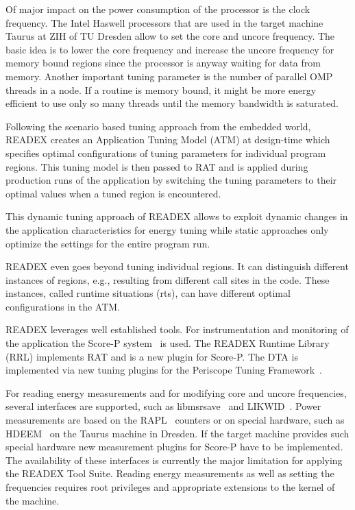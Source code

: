 \documentclass[runningheads]{llncs}
\begin{document}
Of major impact on the power consumption of the processor is the clock frequency. The Intel Haswell processors that are used in the target machine Taurus at ZIH of TU Dresden allow to set the core and  uncore frequency. The basic idea is to lower the core frequency and increase the uncore frequency for memory bound regions since the processor is anyway waiting for data from memory.  Another important tuning parameter is the number of parallel OMP threads in a node. If a routine is memory bound, it might be more energy efficient to use only so many threads until the memory bandwidth is saturated. 

Following the scenario based tuning approach \cite{filippopoulos2013exploration} from the embedded world, READEX creates an Application Tuning Model (ATM) at design-time which specifies optimal configurations of tuning parameters for individual program regions. This tuning model is then passed to RAT and is applied during production runs of the application by switching the tuning parameters to their optimal values when a tuned region is encountered. 

This dynamic tuning approach of READEX allows to exploit dynamic changes in the application characteristics for energy tuning while static approaches only optimize the settings for the entire program run. 

READEX even goes beyond tuning individual regions. It can distinguish different instances of regions, e.g., resulting from different call sites in the code. These instances, called runtime situations (rts), can have different optimal configurations in the ATM. 

READEX leverages well established tools. For instrumentation and monitoring of the application the Score-P system~\cite{knupfer2012score} is used. The READEX Runtime Library (RRL) implements RAT and is a new plugin for Score-P. The DTA is implemented via new tuning plugins for the Periscope Tuning Framework~\cite{PTF2.0IEEE2016}.  

For reading energy measurements and for modifying core and uncore frequencies, several interfaces are supported, such as libmsrsave~\cite{msrsave} and LIKWID~\cite{LIKWID}. Power measurements are based on the RAPL~\cite{Intel2018} counters or on special hardware, such as HDEEM~\cite{hdeem} on the Taurus machine in Dresden. If the target machine provides such special hardware new measurement plugins for Score-P have to be implemented. The availability of these interfaces is currently the major limitation for applying the READEX Tool Suite. Reading energy measurements as well as setting the frequencies requires root privileges and appropriate extensions to the kernel of the machine. 
\end{document}
